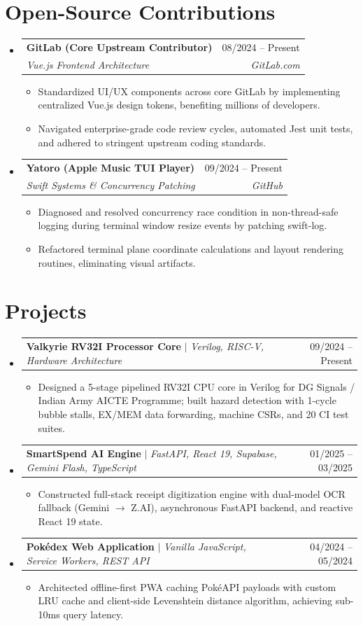 \documentclass[letterpaper,10pt]{article}
\makeatletter
\newcommand{\resumeItem}[1]{\item\small{{#1 \vspace{-2pt}}}}
\newcommand{\resumeSubheading}[4]{
  \vspace{-2pt}\item
    \begin{tabular*}{0.97\textwidth}[t]{l@{\extracolsep{\fill}}r}
      \textbf{#1} & #2 \\
      \textit{\small#3} & \textit{\small #4} \\
    \end{tabular*}\vspace{-7pt}
}
\newcommand{\resumeProjectHeading}[2]{
    \item
    \begin{tabular*}{0.97\textwidth}{l@{\extracolsep{\fill}}r}
      \small#1 & #2 \\
    \end{tabular*}\vspace{-7pt}
}
\newcommand{\resumeSubHeadingListStart}{\begin{itemize}[leftmargin=0.15in, label={}]}
\newcommand{\resumeSubHeadingListEnd}{\end{itemize}}
\newcommand{\resumeItemListStart}{\begin{itemize}}
\newcommand{\resumeItemListEnd}{\end{itemize}\vspace{-5pt}}
\makeatother
\begin{document}
\section{Open-Source Contributions}
  \resumeSubHeadingListStart
    \resumeSubheading
      {GitLab (Core Upstream Contributor)}{08/2024 -- Present}
      {Vue.js Frontend Architecture}{GitLab.com}
      \resumeItemListStart
        \resumeItem{Standardized UI/UX components across core GitLab by implementing centralized Vue.js design tokens, benefiting millions of developers.}
        \resumeItem{Navigated enterprise-grade code review cycles, automated Jest unit tests, and adhered to stringent upstream coding standards.}
      \resumeItemListEnd

    \resumeSubheading
      {Yatoro (Apple Music TUI Player)}{09/2024 -- Present}
      {Swift Systems \& Concurrency Patching}{GitHub}
      \resumeItemListStart
        \resumeItem{Diagnosed and resolved concurrency race condition in non-thread-safe logging during terminal window resize events by patching swift-log.}
        \resumeItem{Refactored terminal plane coordinate calculations and layout rendering routines, eliminating visual artifacts.}
      \resumeItemListEnd
  \resumeSubHeadingListEnd

\section{Projects}
  \resumeSubHeadingListStart
    \resumeProjectHeading
      {\textbf{Valkyrie RV32I Processor Core} $|$ \emph{Verilog, RISC-V, Hardware Architecture}}{09/2024 -- Present}
      \resumeItemListStart
        \resumeItem{Designed a 5-stage pipelined RV32I CPU core in Verilog for DG Signals / Indian Army AICTE Programme; built hazard detection with 1-cycle bubble stalls, EX/MEM data forwarding, machine CSRs, and 20 CI test suites.}
      \resumeItemListEnd

    \resumeProjectHeading
      {\textbf{SmartSpend AI Engine} $|$ \emph{FastAPI, React 19, Supabase, Gemini Flash, TypeScript}}{01/2025 -- 03/2025}
      \resumeItemListStart
        \resumeItem{Constructed full-stack receipt digitization engine with dual-model OCR fallback (Gemini $\rightarrow$ Z.AI), asynchronous FastAPI backend, and reactive React 19 state.}
      \resumeItemListEnd

    \resumeProjectHeading
      {\textbf{Pokédex Web Application} $|$ \emph{Vanilla JavaScript, Service Workers, REST API}}{04/2024 -- 05/2024}
      \resumeItemListStart
        \resumeItem{Architected offline-first PWA caching PokéAPI payloads with custom LRU cache and client-side Levenshtein distance algorithm, achieving sub-10ms query latency.}
      \resumeItemListEnd
  \resumeSubHeadingListEnd
\end{document}
